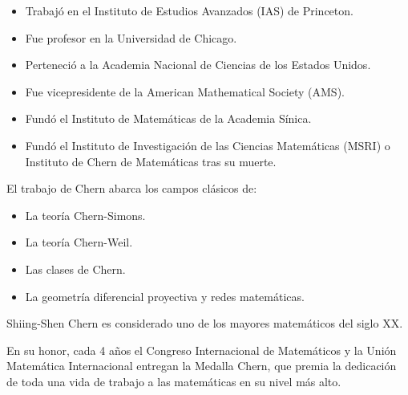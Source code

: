 \documentclass[compress, aspectratio=169]{beamer} %
\begin{document}
		\begin{frame}
			\begin{itemize}
				\item Trabajó en el Instituto de Estudios Avanzados (IAS) de Princeton.
				\item Fue profesor en la Universidad de Chicago.
				\item Perteneció a la Academia Nacional de Ciencias de los Estados Unidos.
				\item Fue vicepresidente de la American Mathematical Society (AMS).
				\item Fundó el Instituto de Matemáticas de la Academia Sínica.
				\item Fundó el Instituto de Investigación de las Ciencias Matemáticas (MSRI) o Instituto de Chern de
				Matemáticas tras su muerte.
			\end{itemize}
			
			\pause
			
			El trabajo de Chern abarca los campos clásicos de:
			\begin{itemize}
				\item La teoría Chern-Simons.
				\item La teoría Chern-Weil.
				\item Las clases de Chern.
				\item La geometría diferencial proyectiva y redes matemáticas.
			\end{itemize}
		\end{frame}	

		\begin{frame}
			Shiing-Shen Chern es considerado uno de los mayores matemáticos del siglo XX.
			
			En su honor, cada 4 años el Congreso Internacional de Matemáticos y la Unión Matemática Internacional entregan
			la Medalla Chern, que premia la dedicación de toda una vida de trabajo a las matemáticas en su nivel más alto.
		\end{frame}
		
\end{document}
